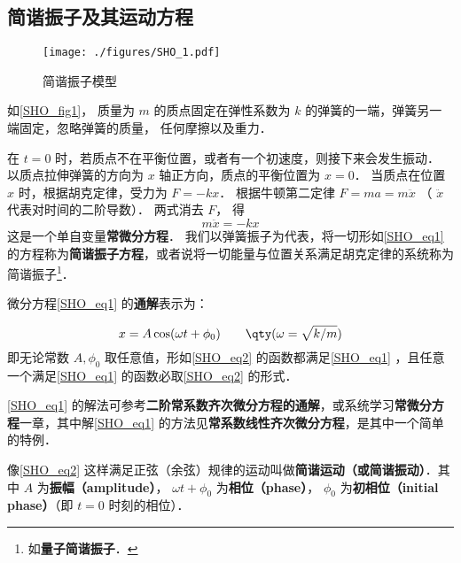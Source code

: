 


\subsection{简谐振子及其运动方程}

\begin{figure}[ht]
\centering
\texttt{[image: ./figures/SHO\_1.pdf]}
\caption{简谐振子模型} \label{SHO_fig1}
\end{figure}

如\autoref{SHO_fig1}， 质量为 $m$ 的质点固定在弹性系数为 $k$ 的弹簧的一端，弹簧另一端固定，忽略弹簧的质量， 任何摩擦以及重力．

在 $t = 0$ 时，若质点不在平衡位置，或者有一个初速度，则接下来会发生振动． 以质点拉伸弹簧的方向为 $x$ 轴正方向，质点的平衡位置为 $x = 0$． 当质点在位置 $x$ 时，根据胡克定律，受力为 $F =  - kx$． 根据牛顿第二定律 $F = ma = m\ddot x$ （ $\ddot x$ 代表对时间的二阶导数）．  两式消去 $F$， 得
\begin{equation}\label{SHO_eq1}
m\ddot x =  - kx
\end{equation}
这是一个单自变量\textbf{常微分方程}． 我们以弹簧振子为代表，将一切形如\autoref{SHO_eq1} 的方程称为\textbf{简谐振子方程}，或者说将一切能量与位置关系满足胡克定律的系统称为简谐振子\footnote{如\textbf{量子简谐振子}．}．


微分方程\autoref{SHO_eq1} 的\textbf{通解}表示为：

\begin{equation}\label{SHO_eq2}
x = A\cos(\omega t + \phi_0)  \qquad \qty(\omega  = \sqrt{k/m})
\end{equation}
即无论常数 $A, \phi_0$ 取任意值，形如\autoref{SHO_eq2} 的函数都满足\autoref{SHO_eq1} ，且任意一个满足\autoref{SHO_eq1} 的函数必取\autoref{SHO_eq2} 的形式．

\autoref{SHO_eq1} 的解法可参考\textbf{二阶常系数齐次微分方程的通解}，或系统学习\textbf{常微分方程}一章，其中解\autoref{SHO_eq1} 的方法见\textbf{常系数线性齐次微分方程}，是其中一个简单的特例．

像\autoref{SHO_eq2} 这样满足正弦（余弦）规律的运动叫做\textbf{简谐运动（或简谐振动）}．其中 $A$ 为\textbf{振幅（amplitude）}， $\omega t + \phi_0$ 为\textbf{相位（phase）}， $\phi_0$ 为\textbf{初相位（initial phase）}（即 $t = 0$ 时刻的相位）． 

